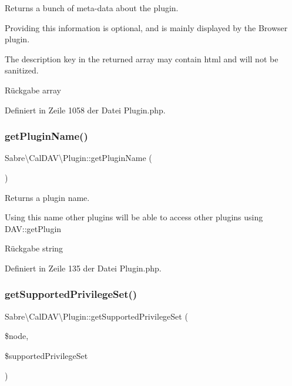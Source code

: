 Returns a bunch of meta-\/data about the plugin.

Providing this information is optional, and is mainly displayed by the Browser plugin.

The description key in the returned array may contain html and will not be sanitized.

\begin{DoxyReturn}{Rückgabe}
array 
\end{DoxyReturn}


Definiert in Zeile 1058 der Datei Plugin.\+php.

\mbox{\label{class_sabre_1_1_cal_d_a_v_1_1_plugin_abf5f5d4bbb586da79ddf124f9618dfa1}} 
\subsubsection{\texorpdfstring{get\+Plugin\+Name()}{getPluginName()}}
{\footnotesize\ttfamily Sabre\textbackslash{}\+Cal\+D\+A\+V\textbackslash{}\+Plugin\+::get\+Plugin\+Name (\begin{DoxyParamCaption}{ }\end{DoxyParamCaption})}

Returns a plugin name.

Using this name other plugins will be able to access other plugins using D\+AV\+::get\+Plugin

\begin{DoxyReturn}{Rückgabe}
string 
\end{DoxyReturn}


Definiert in Zeile 135 der Datei Plugin.\+php.

\mbox{\label{class_sabre_1_1_cal_d_a_v_1_1_plugin_a93ea8b02ec3b301c85ec27242edf0b3d}} 
\subsubsection{\texorpdfstring{get\+Supported\+Privilege\+Set()}{getSupportedPrivilegeSet()}}
{\footnotesize\ttfamily Sabre\textbackslash{}\+Cal\+D\+A\+V\textbackslash{}\+Plugin\+::get\+Supported\+Privilege\+Set (\begin{DoxyParamCaption}\item[{\mbox{\hyperlink{interface_sabre_1_1_d_a_v_1_1_i_node}{I\+Node}}}]{\$node,  }\item[{array \&}]{\$supported\+Privilege\+Set }\end{DoxyParamCaption})}

